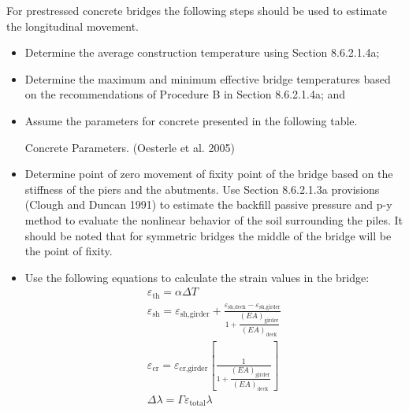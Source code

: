 For prestressed concrete bridges the following steps should be used to estimate the longitudinal movement.
\begin{itemize}
  \item  Determine the average construction temperature using Section 8.6.2.1.4a;
  \item Determine the maximum and minimum effective bridge temperatures based on the recommendations of
  Procedure B in Section 8.6.2.1.4a; and
  \item Assume the parameters for concrete presented in the following table.
  \begin{table}
    \caption{Concrete Parameters. (Oesterle et al. 2005)}
    \label{tab:concrete-parameters}
  \end{table}
  \item Determine point of zero movement of fixity point of the bridge based on the stiffness of the piers and the abutments. Use Section 8.6.2.1.3a provisions (Clough and Duncan 1991) to estimate the backfill passive pressure and p-y method to evaluate the nonlinear behavior of the soil surrounding the piles. It should be noted that for symmetric bridges the middle of the bridge will be the point of fixity.
  \item Use the following equations to calculate the strain values in the bridge:
  \begin{gather}
    \varepsilon_\text{th} =\alpha \Delta T\\
    \varepsilon_\text{sh} = \varepsilon_\text{sh,girder}+ \frac{\varepsilon_\text{sh,deck}-\varepsilon_\text{sh,girder}}{1+\dfrac{(EA)_\text{girder}}{(EA)_\text{deck}}}\\
    \varepsilon_\text{cr}= \varepsilon_\text{cr,girder}\left[\frac{1}{1+\dfrac{(EA)_\text{girder}}{(EA)_\text{deck}}}\right]\\
    \Delta \lambda = \Gamma \varepsilon_\text{total} \lambda
  \end{gather}
\end{itemize}
